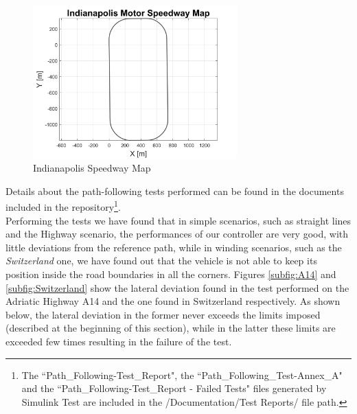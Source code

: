 \begin{enumerate}
    \begin{figure}[H]
    \centering
    \includegraphics[width=0.7\textwidth]{Figures/IndianapolisMap.png}
    \caption{Indianapolis Speedway Map}
      \label{fig:Indianapolis}
\end{figure}
\end{enumerate}

\pagebreak
Details about the path-following tests performed can be found in the documents included in the repository\footnote{The ``Path\_Following-Test\_Report", the ``Path\_Following\_Test-Annex\_A" and the ``Path\_Following-Test\_Report - Failed Tests" files generated by Simulink Test are included in the /Documentation/Test Reports/ file path.}.\\
Performing the tests we have found that in simple scenarios, such as straight lines and the Highway scenario, the performances of our controller are very good, with little deviations from the reference path, while in winding scenarios, such as the \textit{Switzerland} one, we have found out that the vehicle is not able to keep its position inside the road boundaries in all the corners.
Figures \ref{subfig:A14} and \ref{subfig:Switzerland} show the lateral deviation found in the test performed on the Adriatic Highway A14 and the one found in Switzerland respectively. As shown below, the lateral deviation in the former never exceeds the limits imposed (described at the beginning of this section), while in the latter these limits are exceeded few times resulting in the failure of the test.


